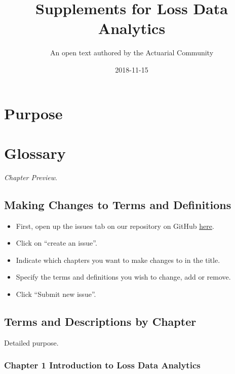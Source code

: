 \documentclass[]{book}
\title{Supplements for Loss Data Analytics}
\author{An open text authored by the Actuarial Community}
\date{2018-11-15}
\providecommand{\tightlist}{%
  \setlength{\itemsep}{0pt}\setlength{\parskip}{0pt}}
\theoremstyle{definition}
\theoremstyle{definition}
\theoremstyle{definition}
\theoremstyle{remark}
\begin{document}
\maketitle

{
\setcounter{tocdepth}{1}
\tableofcontents
}
\chapter{Purpose}\label{purpose}

\chapter{Glossary}\label{glossary}

\emph{Chapter Preview}.

\section{Making Changes to Terms and
Definitions}\label{making-changes-to-terms-and-definitions}

\begin{itemize}
\tightlist
\item
  First, open up the issues tab on our repository on GitHub
  \href{https://github.com/alyaanuval/LDAGlossary/issues}{here}.
\item
  Click on ``create an issue''.
\item
  Indicate which chapters you want to make changes to in the title.
\item
  Specify the terms and definitions you wish to change, add or remove.
\item
  Click ``Submit new issue''.
\end{itemize}

\section{Terms and Descriptions by
Chapter}\label{terms-and-descriptions-by-chapter}

Detailed purpose.

\subsection{Chapter 1 Introduction to Loss Data
Analytics}\label{chapter-1-introduction-to-loss-data-analytics}
\end{document}
